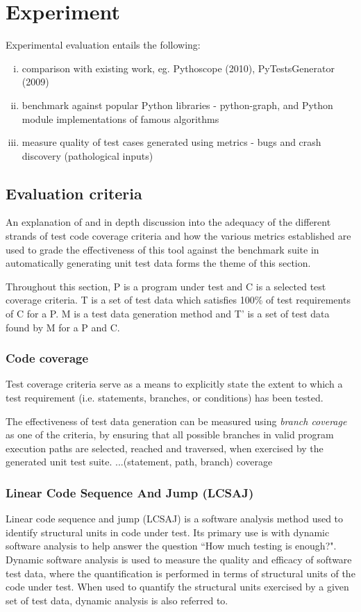 \documentclass{icldt}
\numberwithin{equation}{section}       %
\begin{document}
{\section{Experiment}
Experimental evaluation entails the following:
\begin{enumerate}[i.]
	\item comparison with existing work, eg. Pythoscope (2010), PyTestsGenerator (2009)
	\item benchmark against popular Python libraries - python-graph, and Python module implementations of famous algorithms
	\item measure quality of test cases generated using metrics - bugs and crash discovery (pathological inputs)	
\end{enumerate}

\subsection{Evaluation criteria}
An explanation of and in depth discussion into the adequacy of the different strands of test code coverage criteria and how the various metrics established are used to grade the effectiveness of this tool against the benchmark suite in automatically generating unit test data forms the theme of this section.

Throughout this section, P is a program under test and C is a selected test coverage criteria. T is a set of test data which satisfies 100\% of test requirements of C for a P. M is a test data generation method and T' is a set of test data found by M for a P and C.

\subsubsection{Code coverage}
Test coverage criteria serve as a means to explicitly state the extent to which a test requirement (i.e. statements, branches, or conditions) has been tested.

The effectiveness of test data generation can be measured using \emph{branch coverage} as one of the criteria, by ensuring that all possible branches in valid program execution paths are selected, reached and traversed, when exercised by the generated unit test suite.
...(statement, path, branch) coverage 

\subsubsection{Linear Code Sequence And Jump (LCSAJ)}
Linear code sequence and jump (LCSAJ) is a software analysis method used to identify structural units in code under test. Its primary use is with dynamic software analysis to help answer the question ``How much testing is enough?". Dynamic software analysis is used to measure the quality and efficacy of software test data, where the quantification is performed in terms of structural units of the code under test. When used to quantify the structural units exercised by a given set of test data, dynamic analysis is also referred to.

}
\end{document}
